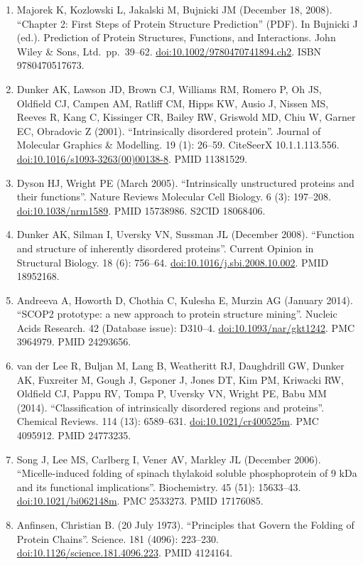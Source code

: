 \documentclass[
]{book}
\providecommand{\tightlist}{%
  \setlength{\itemsep}{0pt}\setlength{\parskip}{0pt}}
\begin{document}
\begin{enumerate}
\def\labelenumi{\arabic{enumi}.}
\tightlist
\item
  Majorek K, Kozlowski L, Jakalski M, Bujnicki JM (December 18, 2008). ``Chapter 2: First Steps of Protein Structure Prediction'' (PDF). In Bujnicki J (ed.). Prediction of Protein Structures, Functions, and Interactions. John Wiley \& Sons, Ltd.~pp.~39--62. \url{doi:10.1002/9780470741894.ch2}. ISBN 9780470517673.
\item
  Dunker AK, Lawson JD, Brown CJ, Williams RM, Romero P, Oh JS, Oldfield CJ, Campen AM, Ratliff CM, Hipps KW, Ausio J, Nissen MS, Reeves R, Kang C, Kissinger CR, Bailey RW, Griswold MD, Chiu W, Garner EC, Obradovic Z (2001). ``Intrinsically disordered protein''. Journal of Molecular Graphics \& Modelling. 19 (1): 26--59. CiteSeerX 10.1.1.113.556. \url{doi:10.1016/s1093-3263(00)00138-8}. PMID 11381529.
\item
  Dyson HJ, Wright PE (March 2005). ``Intrinsically unstructured proteins and their functions''. Nature Reviews Molecular Cell Biology. 6 (3): 197--208. \url{doi:10.1038/nrm1589}. PMID 15738986. S2CID 18068406.
\item
  Dunker AK, Silman I, Uversky VN, Sussman JL (December 2008). ``Function and structure of inherently disordered proteins''. Current Opinion in Structural Biology. 18 (6): 756--64. \url{doi:10.1016/j.sbi.2008.10.002}. PMID 18952168.
\item
  Andreeva A, Howorth D, Chothia C, Kulesha E, Murzin AG (January 2014). ``SCOP2 prototype: a new approach to protein structure mining''. Nucleic Acids Research. 42 (Database issue): D310--4. \url{doi:10.1093/nar/gkt1242}. PMC 3964979. PMID 24293656.
\item
  van der Lee R, Buljan M, Lang B, Weatheritt RJ, Daughdrill GW, Dunker AK, Fuxreiter M, Gough J, Gsponer J, Jones DT, Kim PM, Kriwacki RW, Oldfield CJ, Pappu RV, Tompa P, Uversky VN, Wright PE, Babu MM (2014). ``Classification of intrinsically disordered regions and proteins''. Chemical Reviews. 114 (13): 6589--631. \url{doi:10.1021/cr400525m}. PMC 4095912. PMID 24773235.
\item
  Song J, Lee MS, Carlberg I, Vener AV, Markley JL (December 2006). ``Micelle-induced folding of spinach thylakoid soluble phosphoprotein of 9 kDa and its functional implications''. Biochemistry. 45 (51): 15633--43. \url{doi:10.1021/bi062148m}. PMC 2533273. PMID 17176085.
\item
  Anfinsen, Christian B. (20 July 1973). ``Principles that Govern the Folding of Protein Chains''. Science. 181 (4096): 223--230. \url{doi:10.1126/science.181.4096.223}. PMID 4124164.

\end{enumerate}
\end{document}
